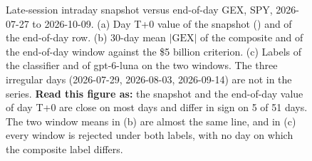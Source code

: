 \begin{figure}[H]
\centering
\resultfigure{\figIntraday}
\caption{Late-session intraday snapshot versus end-of-day GEX, SPY, 2026-07-27 to 2026-10-09. (a) Day T+0 value of the snapshot () and of the end-of-day row. (b) 30-day mean $|\mathrm{GEX}|$ of the composite and of the end-of-day window against the \$5 billion criterion. (c) Labels of the classifier and of gpt-6-luna on the two windows. The three irregular days (2026-07-29, 2026-08-03, 2026-09-14) are not in the series. \textbf{Read this figure as:} the snapshot and the end-of-day value of day T+0 are close on most days and differ in sign on 5 of 51 days. The two window means in (b) are almost the same line, and in (c) every window is rejected under both labels, with no day on which the composite label differs.}
\label{fig:intraday}
\end{figure}
